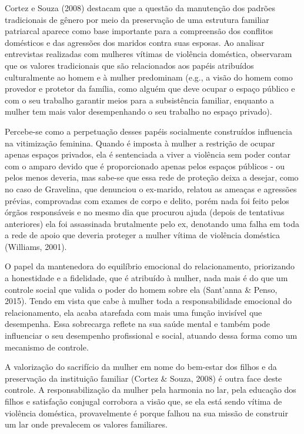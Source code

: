 Cortez e Souza (2008) destacam que a questão da manutenção dos padrões tradicionais de gênero por meio da preservação de uma estrutura familiar patriarcal aparece como base importante para a compreensão dos conflitos domésticos e das agressões dos maridos contra suas esposas. Ao analisar entrevistas realizadas com mulheres vítimas de violência doméstica, observaram que os valores tradicionais que são relacionados aos papéis atribuídos culturalmente ao homem e à mulher predominam (e.g., a visão do homem como provedor e protetor da família, como alguém que deve ocupar o espaço público e com o seu trabalho garantir meios para a subsistência familiar, enquanto a mulher tem mais valor desempenhando o seu trabalho no espaço privado).

Percebe-se como a perpetuação desses papéis socialmente construídos influencia na vitimização feminina. Quando é imposta à mulher a restrição de ocupar apenas espaços privados, ela é sentenciada a viver a violência sem poder contar com o amparo devido que é proporcionado apenas pelos espaços públicos - ou pelos menos deveria, mas sabe-se que essa rede de proteção deixa a desejar, como no caso de Gravelina, que denunciou o ex-marido, relatou as ameaças e agressões prévias, comprovadas com exames de corpo e delito, porém nada foi feito pelos órgãos responsáveis e no mesmo dia que procurou ajuda (depois de tentativas anteriores) ela foi assassinada brutalmente pelo ex, denotando uma falha em toda a rede de apoio que deveria proteger a mulher vítima de violência doméstica (Williams, 2001).

O papel da mantenedora do equilíbrio emocional do relacionamento, priorizando a honestidade e a fidelidade, que é atribuído à mulher, nada mais é do que um controle social que valida o poder do homem sobre ela (Sant'anna \& Penso, 2015). Tendo em vista que cabe à mulher toda a responsabilidade emocional do relacionamento, ela acaba atarefada com mais uma função invisível que desempenha. Essa sobrecarga reflete na sua saúde mental e também pode influenciar o seu desempenho profissional e social, atuando dessa forma como um mecanismo de controle. 

A valorização do sacrifício da mulher em nome do bem-estar dos filhos e da preservação da instituição familiar (Cortez \& Souza, 2008) é outra face deste controle. A responsabilização da mulher pela harmonia no lar, pela educação dos filhos e satisfação conjugal corrobora a visão que, se ela está sendo vítima de violência doméstica, provavelmente é porque falhou na sua missão de construir um lar onde prevalecem os valores familiares.

